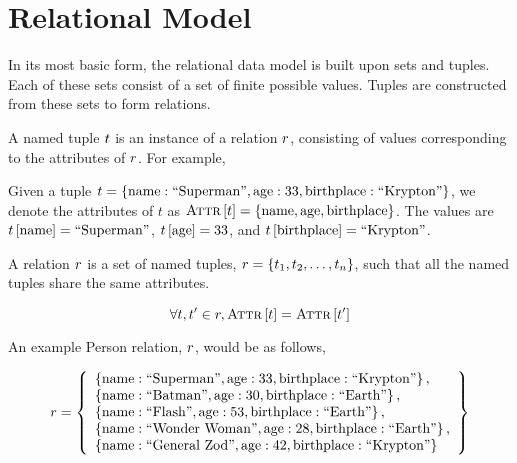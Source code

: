 \section{Relational Model}
	In its most basic form, the relational data model is built upon sets and tuples.  Each of these sets consist of a set of finite possible values.  Tuples are constructed from these sets to form relations.
	
	\begin{defn}
	\label{def:named-tuple}
		A named tuple $t$ is an instance of a relation $r$, consisting of values corresponding to the attributes of $r$.  For example,
	\end{defn}
	
	\begin{ex}
		Given a tuple $t = \left\{\mathrm{name}: \textrm{``Superman''}, \mathrm{age}: 33, \mathrm{birthplace}: \textrm{``Krypton''}\right\}$, we denote the attributes of $t$ as $\textsc{Attr}\left[t\right] = \left\{\mathrm{name}, \mathrm{age}, \mathrm{birthplace}\right\}$.  The values are $t\left[\mathrm{name}\right] = \textrm{``Superman''}$, $t\left[\mathrm{age}\right] = 33$, and $t\left[\mathrm{birthplace}\right] = \textrm{``Krypton''}$.
	\end{ex}
	
	\begin{defn}[Relation]
	\label{def:relation}
		A relation $r$ is a set of named tuples, $r = \left\{t_1, t_2, \dotsc, t_n\right\}$, such that all the named tuples share the same attributes.
		
		$$\forall t, t' \in r, \textsc{Attr}\left[t\right] = \textsc{Attr}\left[t'\right]$$
	\end{defn}
	
	\begin{ex}
		An example Person relation, $r$, would be as follows,
		
		$$r = \left\{
			\begin{array}{l}
				\left\{\mathrm{name}: \textrm{``Superman''}, \mathrm{age}: 33, \mathrm{birthplace}: \textrm{``Krypton''}\right\}, \\
				\left\{\mathrm{name}: \textrm{``Batman''}, \mathrm{age}: 30, \mathrm{birthplace}: \textrm{``Earth''}\right\}, \\
				\left\{\mathrm{name}: \textrm{``Flash''}, \mathrm{age}: 53, \mathrm{birthplace}: \textrm{``Earth''}\right\}, \\
				\left\{\mathrm{name}: \textrm{``Wonder Woman''}, \mathrm{age}: 28, \mathrm{birthplace}: \textrm{``Earth''}\right\}, \\
				\left\{\mathrm{name}: \textrm{``General Zod''}, \mathrm{age}: 42, \mathrm{birthplace}: \textrm{``Krypton''}\right\}
			\end{array}
		\right\}$$
	\end{ex}
		
